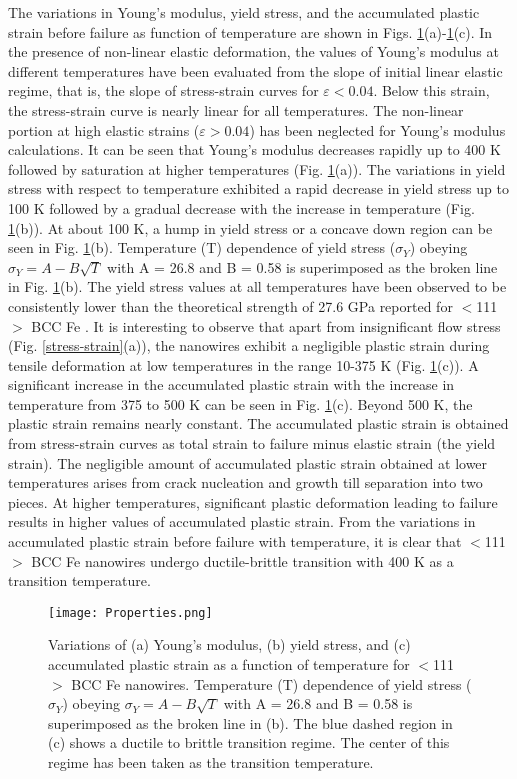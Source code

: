 \documentclass[%
reprint,%
 amssymb, amsmath,%
 aip,apl,%
]{revtex4-1}
\begin{document}
The variations in Young’s modulus, yield stress, and the accumulated plastic strain before failure as function of temperature are 
shown in Figs. \ref{Properties}(a)-\ref{Properties}(c). In the presence of non-linear elastic deformation, the values of Young’s 
modulus at different temperatures have been evaluated from the slope of initial linear elastic regime, that is, the slope of 
stress-strain curves for $\varepsilon < 0.04$. Below this strain, the stress-strain curve is nearly linear for all temperatures. 
The non-linear portion at high elastic strains ($\varepsilon > 0.04$) has been neglected for Young’s modulus calculations. It can 
be seen that Young’s modulus decreases rapidly up to 400 K followed by saturation at higher temperatures (Fig. \ref{Properties}(a)). 
The variations in yield stress with respect to temperature exhibited a rapid decrease in yield stress up to 100 K followed by a 
gradual decrease with the increase in temperature (Fig. \ref{Properties}(b)). At about 100 K, a hump in yield stress or a concave 
down region can be seen in Fig. \ref{Properties}(b). Temperature (T) dependence of yield stress ($\sigma_Y$) obeying $\sigma_Y = 
A - B\sqrt{T}$ with A = 26.8 and B = 0.58 is superimposed as the broken line in Fig. \ref{Properties}(b). The yield stress values 
at all temperatures have been observed to be consistently lower than the theoretical strength of 27.6 GPa reported for $<$111$>$ 
BCC Fe \cite{Strength-Friak}. It is interesting to observe that apart from insignificant flow stress (Fig. \ref{stress-strain}(a)), 
the nanowires exhibit a negligible plastic strain during tensile deformation at low temperatures in the range 10-375 K (Fig. 
\ref{Properties}(c)). A significant increase in the accumulated plastic strain with the increase in temperature from 375 to 500 K 
can be seen in Fig. \ref{Properties}(c). Beyond 500 K, the plastic strain remains nearly constant. The accumulated plastic strain 
is obtained from stress-strain curves as total strain to failure minus elastic strain (the yield strain). The negligible amount of 
accumulated plastic strain obtained at lower temperatures arises from crack nucleation and growth till separation into two pieces. 
At higher temperatures, significant plastic deformation leading to failure results in higher values of accumulated plastic strain. 
From the variations in accumulated plastic strain before failure with temperature, it is clear that $<$111$>$ BCC Fe nanowires 
undergo ductile-brittle transition with 400 K as a transition temperature.

\begin{figure}
\centering
\texttt{[image: Properties.png]}
\caption { Variations of (a) Young’s modulus, (b) yield stress, and (c) accumulated plastic strain as a function of 
temperature for $<$111$>$ BCC Fe nanowires. Temperature (T) dependence of yield stress ($\sigma_Y$) obeying $\sigma_Y = A - B\sqrt{T}$ 
with A = 26.8 and B = 0.58 is superimposed as the broken line in (b). The blue dashed region in (c) shows a ductile to brittle transition 
regime. The center of this regime has been taken as the transition temperature.}
\label{Properties}
\end{figure}
\end{document}
